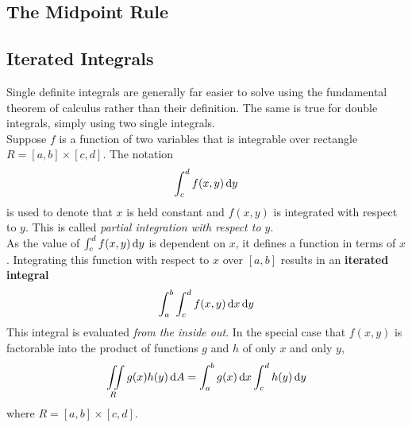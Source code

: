 \documentclass[../Calculus \Roman{3}.tex]{subfiles}
\begin{document}
		\subsection*{The Midpoint Rule}
		\subsection*{Iterated Integrals}
			Single definite integrals are generally far easier to solve using the fundamental theorem of calculus rather than their definition. The same is true for double integrals, simply using two single integrals. \\
			Suppose $f$ is a function of two variables that is integrable over rectangle $R = [a, b] \times [c, d]$. The notation
				\[\int_c^d f(x, y)\,\mathrm{d} y\]
				is used to denote that $x$ is held constant and $f(x, y)$ is integrated with respect to $y$. This is called \textit{partial integration with respect to $y$}. \\
				As the value of $\int_c^d f(x, y)\,\mathrm{d} y$ is dependent on $x$, it defines a function in terms of $x$. Integrating this function with respect to $x$ over $[a, b]$ results in an \textbf{iterated integral}
				\[\int_a^b\int_c^d f(x, y)\,\mathrm{d} x\,\mathrm{d} y\]
				This integral is evaluated \textit{from the inside out}.
			In the special case that $f(x, y)$ is factorable into the product of functions $g$ and $h$ of only $x$ and only $y$,
				\[\iint\limits_R g(x)h(y)\,\mathrm{d} A = \int_a^bg(x)\,\mathrm{d} x\int_c^dh(y)\,\mathrm{d} y\]
				where $R = [a, b] \times [c, d]$.
\end{document}

